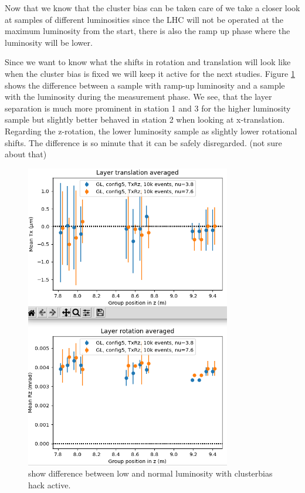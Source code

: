 Now that we know that the cluster bias can be taken care of we take a closer look at samples of different luminosities since the LHC will not be operated at the maximum luminosity from the start, there is also the ramp up phase where the luminosity will be lower.

Since we want to know what the shifts in rotation and translation will look like when the cluster bias is fixed we will keep it active for the next studies.
Figure \ref{fig:lumi_low_normal_hack_on} shows the difference between a sample with ramp-up luminosity and a sample with the luminosity during the measurement phase.
We see, that the layer separation is much more prominent in station 1 and 3 for the higher luminosity sample but slightly better behaved in station 2 when looking at x-translation.
Regarding the z-rotation, the lower luminosity sample as slightly lower rotational shifts.
The difference is so minute that it can be safely disregarded. (not sure about that)

\begin{figure}
  \centering
  \includegraphics[width=0.8\textwidth]{plots/jan_24_2022/low_normal_with_hack.png}
  \caption{show difference between low and normal luminosity with clusterbias hack active.}
  \label{fig:lumi_low_normal_hack_on}
\end{figure}

